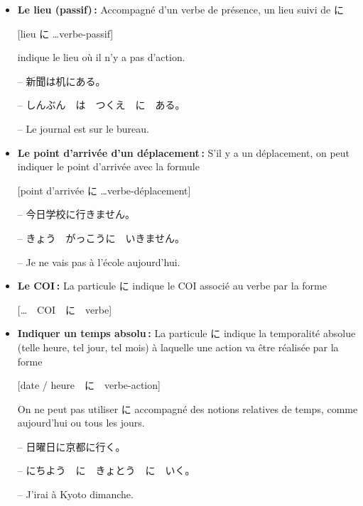     \begin{itemize}
        \item \textbf{Le lieu (passif) :} Accompagné d'un verbe de présence, un lieu suivi de に 
        \begin{center}
            [lieu に \dots verbe-passif]
        \end{center}
        indique le lieu où il n'y a pas d'action.

        \begin{tcolorbox}
            -- 新聞は机にある。

            -- しんぶん　は　つくえ　に　ある。

            -- Le journal est sur le bureau.
        \end{tcolorbox}

        \item \textbf{Le point d'arrivée d'un déplacement :} S'il y a un déplacement, on peut indiquer le point d'arrivée avec la formule 
        \begin{center}
            [point d'arrivée に \dots verbe-déplacement]
        \end{center}
        \begin{tcolorbox}
            -- 今日学校に行きません。

            -- きょう　がっこうに　いきません。

            -- Je ne vais pas à l'école aujourd'hui.
        \end{tcolorbox}

        \item \textbf{Le COI :} La particule に indique le COI associé au verbe par la forme 
        \begin{center}
            [\dots　COI　に　verbe]
        \end{center}

        \item \textbf{Indiquer un temps absolu :} La particule に indique la temporalité absolue (telle heure, tel jour, tel mois) à laquelle une action va être réalisée par la forme 
        \begin{center}
            [date / heure　に　verbe-action]
        \end{center}
        On ne peut pas utiliser に accompagné des notions relatives de temps, comme aujourd'hui ou tous les jours.
        \begin{tcolorbox}
            -- 日曜日に京都に行く。
            
            -- にちよう　に　きょとう　に　いく。

            -- J'irai à Kyoto dimanche.
        \end{tcolorbox}
    \end{itemize}

